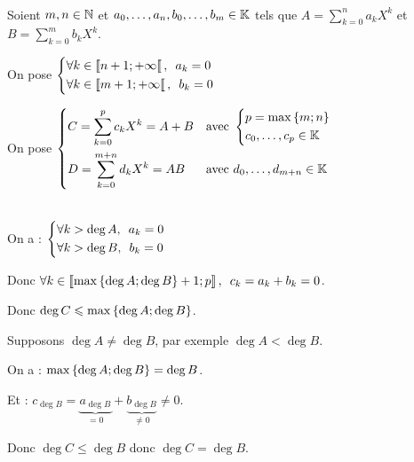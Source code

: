 \begin{dem}~\\\renewcommand{\cqfd}{}
Soient \(m,n\in\mathbb{N}\) et \(a_0,\dots,a_n,b_0,\dots,b_m\in\mathbb{K}\) tels que \(A=\sum_{k=0}^{n}a_kX^k\) et \(B=\sum_{k=0}^{m}b_kX^k\).

On pose \(\begin{dcases}\quantifs{\forall k\in\interventierie{n+1}{\pinf}}a_k=0 \\ \quantifs{\forall k\in\interventierie{m+1}{\pinf}}b_k=0\end{dcases}\)

On pose \(\begin{dcases}C=\sum_{k=0}^{p}c_kX^k=A+B&\text{avec }\begin{dcases}p=\max\left\lbrace m;n\right\rbrace \\ c_0,\dots,c_p\in\mathbb{K}\end{dcases} \\ D=\sum_{k=0}^{m+n}d_kX^k=AB&\text{avec }d_0,\dots,d_{m+n}\in\mathbb{K}\end{dcases}\)
\end{dem}

\begin{dem}[1]~\\
On a : \(\begin{dcases}\quantifs{\forall k>\deg A}a_k=0 \\ \quantifs{\forall k>\deg B}b_k=0\end{dcases}\)

Donc \(\quantifs{\forall k\in\interventierii{\max\accol{\deg A;\deg B}+1}{p}}c_k=a_k+b_k=0\).

Donc \(\deg C\leqslant\max\left\lbrace\deg A;\deg B\right\rbrace\).

Supposons \(\deg A\not=\deg B\), par exemple \(\deg A<\deg B\).

On a : \(\max\left\lbrace\deg A;\deg B\right\rbrace=\deg B\).

Et : \(c_{\deg B}=\underbrace{a_{\deg B}}_{=0}+\underbrace{b_{\deg B}}_{\not=0}\not=0\).

Donc \(\deg C\leq\deg B\) donc \(\deg C=\deg B\).
\end{dem}

